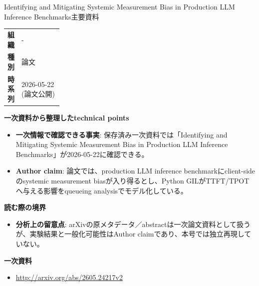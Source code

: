 \begin{technicalnote}{Identifying and Mitigating Systemic Measurement Bias in Production LLM Inference Benchmarks}{主要資料}
\begingroup
\begin{tabularx}{\linewidth}{@{}>{\bfseries}p{0.22\linewidth}X@{}}
組織 & - \\
種別 & 論文 \\
時系列 & 2026-05-22 (論文公開) \\
\end{tabularx}
\smallskip
{\bfseries 一次資料から整理したtechnical points}
\begin{itemize}[leftmargin=1.5em,itemsep=0.35em]
\item \textbf{一次情報で確認できる事実}: 保存済み一次資料では「Identifying and Mitigating Systemic Measurement Bias in Production LLM Inference Benchmarks」が2026-05-22に確認できる。
\end{itemize}
\begin{minipage}{\linewidth}
\begin{itemize}[leftmargin=1.5em,itemsep=0.35em]
\item \textbf{Author claim}: 論文では、production LLM inference benchmarkにclient-sideのsystemic measurement biasが入り得るとし、Python GILがTTFT/TPOTへ与える影響をqueueing analysisでモデル化している。
\end{itemize}
{\bfseries 読む際の境界}
\begin{itemize}[leftmargin=1.5em,itemsep=0.35em]
\item \textbf{分析上の留意点}: arXivの原メタデータ／abstractは一次論文資料として扱うが、実験結果と一般化可能性はAuthor claimであり、本号では独立再現していない。
\end{itemize}
\begin{samepage}
{\bfseries 一次資料}
\begingroup\sloppy
\begin{itemize}[leftmargin=1.5em,itemsep=0.25em]
\item {\scriptsize\url{http://arxiv.org/abs/2605.24217v2}}
\end{itemize}
\endgroup
\end{samepage}
\end{minipage}
\endgroup
\end{technicalnote}
\medskip

